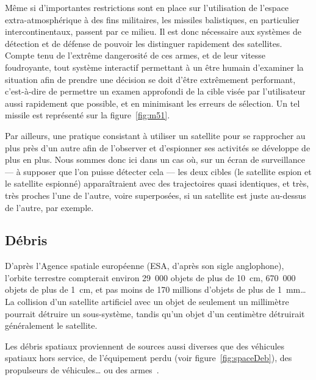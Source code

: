 	Même si d'importantes restrictions sont en place sur l'utilisation de l'espace extra-atmosphérique à des fins militaires\footnotemark, les missiles balistiques, en particulier intercontinentaux, passent par ce milieu. Il est donc nécessaire aux systèmes de détection et de défense de pouvoir les distinguer rapidement des satellites. Compte tenu de l'extrême dangerosité de ces armes, et de leur vitesse foudroyante, tout système interactif permettant à un être humain d'examiner la situation afin de prendre une décision se doit d'être extrêmement performant, c'est-à-dire de permettre un examen approfondi de la cible visée par l'utilisateur aussi rapidement que possible, et en minimisant les erreurs de sélection. Un tel missile est représenté sur la figure~\ref{fig:m51}.
	
	Par ailleurs, une pratique consistant à utiliser un satellite pour se rapprocher au plus près d'un autre afin de l'observer et d'espionner ses activités se développe de plus en plus. Nous sommes donc ici dans un cas où, sur un écran de surveillance --- à supposer que l'on puisse détecter cela --- les deux cibles (le satellite espion et le satellite espionné) apparaîtraient avec des trajectoires quasi identiques, et très, très proches l'une de l'autre, voire superposées, si un satellite est juste au-dessus de l'autre, par exemple.
	
	
	\FloatBarrier \subsection{Débris}
	D'après l'Agence spatiale européenne (ESA, d'après son sigle anglophone), l'orbite terrestre compterait environ 29~000 objets de plus de 10~cm, 670~000 objets de plus de 1~cm, et pas moins de 170 millions d'objets de plus de 1~mm\ldots{} La collision d'un satellite artificiel avec un objet de seulement un millimètre pourrait détruire un sous-système, tandis qu'un objet d'un centimètre détruirait généralement le satellite\footnotemark.
	
	
	Les débris spatiaux proviennent de sources aussi diverses que des véhicules spatiaux hors service, de l'équipement perdu (voir figure~\ref{fig:spaceDeb}), des propulseurs de véhicules\ldots{} ou des armes\footnotemark~\cite{chun1999shooting}.
	
